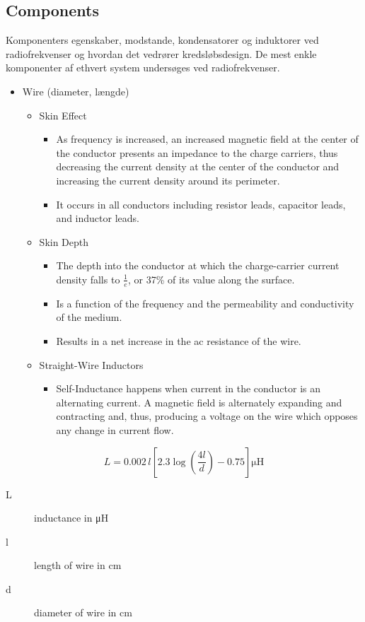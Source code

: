 \subsection{Components}
Komponenters egenskaber, modstande, kondensatorer og induktorer ved radiofrekvenser og hvordan det vedrører kredsløbsdesign. De mest enkle komponenter af ethvert system undersøges ved radiofrekvenser.
\begin{itemize}
	\item Wire (diameter, længde)
	\begin{itemize}
		\item Skin Effect
		\begin{itemize}
			\item As frequency is increased, an increased magnetic field at the center of the conductor presents an impedance to the charge carriers, thus decreasing the current density at the center of the conductor and increasing the current density around its perimeter.
			\item It occurs in all conductors including resistor leads,
			capacitor leads, and inductor leads.
		\end{itemize}
		\item Skin Depth
		\begin{itemize}
			\item The depth into the conductor at which the charge-carrier current density falls to $\frac{1}{e}$, or 37\% of its value along the surface.
			\item Is a function of the frequency and the permeability and conductivity of the medium.
			\item Results in a net increase in	the ac resistance of the wire.
		\end{itemize} 
		\item Straight-Wire Inductors
		\begin{itemize}
			\item Self-Inductance happens when current in the conductor is an alternating current. A magnetic field is alternately expanding
			and contracting and, thus, producing a voltage on the wire which
			opposes any change in current flow.
		\end{itemize}
	\end{itemize}
\end{itemize}

\begin{equation}
L = 0.002\,l\left[2.3\log\left(\dfrac{4l}{d}\right)-0.75\right] \si{\micro\henry}
\end{equation}
\begin{description}
	\item[L] inductance in \si{\micro\henry}
	\item[l] length of wire in \si{\centi\meter}
	\item[d] diameter of wire in \si{\centi\meter}
\end{description}

